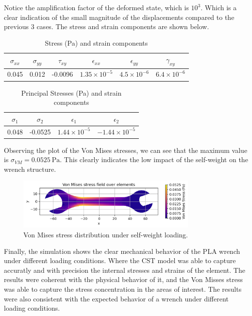 Notice the amplification factor of the deformed state, which is $10^3$. Which is a clear indication of the small magnitude of the displacements compared to the previous 3 cases. The stress and strain components are shown below.

\begin{table}[H]
    \centering
    \caption{Stress (Pa) and strain components}
    \begin{tabular}{|c|c|c|c|c|c|}
    \hline
    $\sigma_{xx}$ & $\sigma_{yy}$ & $\tau_{xy}$ & $\epsilon_{xx}$ & $\epsilon_{yy}$ & $\gamma_{xy}$ \\
    \hline
    0.045 & 0.012 & -0.0096 & $1.35\times10^{-5}$ & $4.5\times10^{-6}$ & $6.4\times10^{-6}$ \\
    \hline
    \end{tabular}
    \label{tab:tabla1}
\end{table}
    
\begin{table}[H]
    \centering
    \caption{Principal Stresses (Pa) and strain components}
    \begin{tabular}{|c|c|c|c|}
    \hline
    $\sigma_{1}$ & $\sigma_{2}$ & $\epsilon_{1}$ & $\epsilon_{2}$ \\
    \hline
    0.048 & -0.0525 & $1.44\times10^{-5}$ & $-1.44\times10^{-5}$ \\
    \hline
    \end{tabular}
    \label{tab:tabla2}
\end{table}

Observing the plot of the Von Mises stresses, we can see that the maximum value is $\sigma_{VM} = 0.0525\ \text{Pa}$.  
This clearly indicates the low impact of the self-weight on the wrench structure.

\begin{figure}[H]
    \centering
    \includegraphics[width=0.8\textwidth]{GRAFICOS/Case d_von_mises.png}
    \caption{Von Mises stress distribution under self-weight loading.}
    \label{fig:principal}
\end{figure}


Finally, the simulation shows the clear mechanical behavior of the PLA wrench under different loading conditions. Where the CST model was able to capture accuratly and with precision the internal stresses and strains of the element. The results were coherent with the physical behavior of it, and the Von Misses stress was able to capture the stress concentration in the areas of interest. The results were also consistent with the expected behavior of a wrench under different loading conditions.




